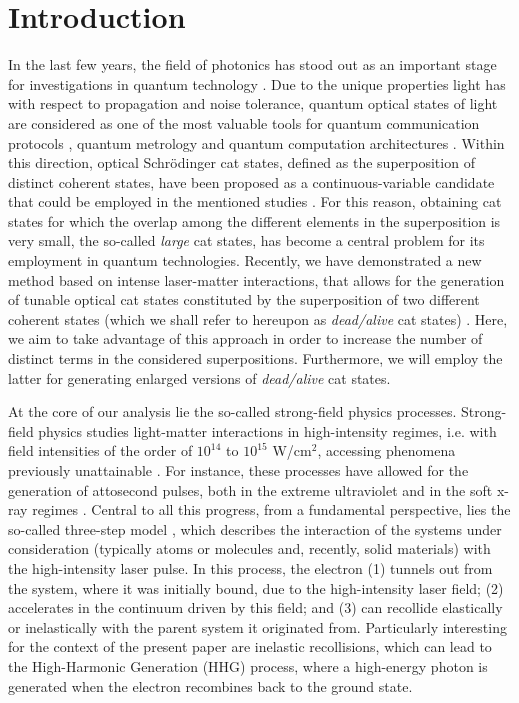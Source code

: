 \section{Introduction}\label{intro}
In the last few years, the field of photonics has stood out as an important stage for investigations in quantum technology \cite{OBrien2009}. Due to the unique properties light has with respect to propagation and noise tolerance, quantum optical states of light are considered as one of the most valuable tools for quantum communication protocols \cite{Gisin2007}, quantum metrology \cite{Giovannetti2004} and quantum computation architectures \cite{NielsenChuangBook}. Within this direction, optical Schrödinger cat states, defined as the superposition of distinct coherent states, have been proposed as a continuous-variable candidate that could be employed in the mentioned studies \cite{Gilchrist2004}. For this reason, obtaining cat states for which the overlap among the different elements in the superposition is very small, the so-called \emph{large} cat states, has become a central problem for its employment in quantum technologies. Recently, we have demonstrated a new method based on intense laser-matter interactions, that allows for the generation of tunable optical cat states constituted by the superposition of two different coherent states (which we shall refer to hereupon as \emph{dead/alive} cat states) \cite{Lewenstein2020}. Here, we aim to take advantage of this approach in order to increase the number of distinct terms in the considered superpositions. Furthermore, we will employ the latter for generating enlarged versions of \emph{dead/alive} cat states.

At the core of our analysis lie the so-called strong-field physics processes. Strong-field physics studies light-matter interactions in high-intensity regimes, i.e. with field intensities of the order of $10^{14}$ to $10^{15}$ W/cm$^2$, accessing phenomena previously unattainable \cite{Amini2019, Krausz2009, Ciappina2017}. For instance, these processes have allowed for the generation of attosecond pulses, both in the extreme ultraviolet \cite{Drescher2001} and in the soft x-ray regimes \cite{Popmintchev2012}. Central to all this progress, from a fundamental perspective, lies the so-called three-step model \cite{Corkum1993, KulanderBook, Lewenstein1994}, which describes the interaction of the systems under consideration (typically atoms or molecules and, recently, solid materials) with the high-intensity laser pulse. In this process, the electron (1) tunnels out from the system, where it was initially bound, due to the high-intensity laser field; (2) accelerates in the continuum driven by this field; and (3) can recollide elastically or inelastically with the parent system it originated from. Particularly interesting for the context of the present paper are inelastic recollisions, which can lead to the High-Harmonic Generation (HHG) process, where a high-energy photon is generated when the electron recombines back to the ground state.

